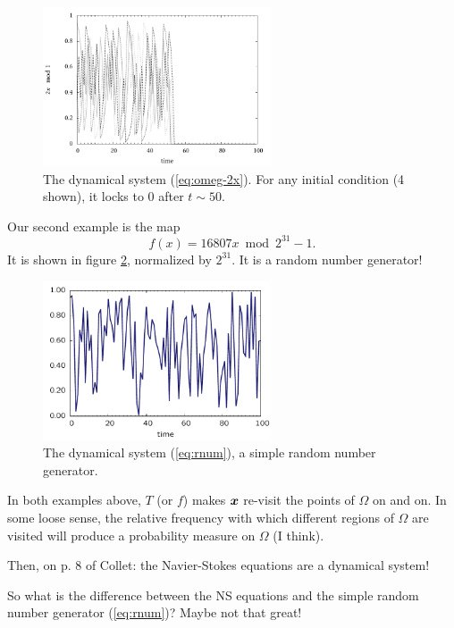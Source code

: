 \documentclass[12pt]{article}
\begin{document}
\begin{figure}
\centering
\includegraphics[width=0.6\textwidth]{omeg-2x}
\caption{The dynamical system (\protect\ref{eq:omeg-2x}). For any initial
  condition (4 shown), it locks to 0 after $t \sim 50$.\label{fig:omeg-2x}}
\end{figure}

Our second example is the map
\begin{equation}
f(x) = 16807 x \bmod 2^{31} - 1.  \label{eq:rnum}
\end{equation}
It is shown in figure \ref{fig:rnum}, normalized by $2^{31}$. It is a random
number generator!


\begin{figure}
\centering
\includegraphics[width=0.6\textwidth]{rnum}
\caption{The dynamical system (\protect\ref{eq:rnum}), a simple random number
  generator.}
\label{fig:rnum}
\end{figure}

In both examples above, $T$ (or $f$) makes $\boldsymbol{x}$ re-visit the points of
$\Omega$ on and on. In some loose sense, the relative frequency with which
different regions of $\Omega$ are visited will produce a probability measure on
$\Omega$ (I think).


Then, on p. 8 of Collet: the Navier-Stokes equations are a dynamical system!

So what is the difference between the NS equations and the simple random number
generator (\ref{eq:rnum})?  Maybe not that great!
\end{document}
